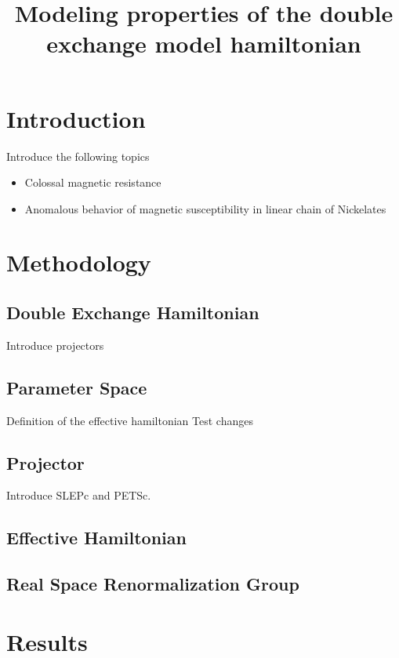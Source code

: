 \documentclass[ openright,titlepage,numbers=noenddot,headinclude,twoside,%
                footinclude=true,cleardoublepage=empty,abstractoff,%
                BCOR=5mm,paper=a4,fontsize=11pt,%
                ngerman,american,%
]{scrreprt}
\title{Modeling properties of the double exchange model hamiltonian}
\begin{document}
\maketitle
\thispagestyle{fancy}
\chapter{Introduction}

Introduce the following topics
\begin{itemize}
  \item Colossal magnetic resistance
  \item Anomalous behavior of magnetic susceptibility in linear chain of Nickelates
\end{itemize}

\chapter{Methodology}

\section{Double Exchange Hamiltonian}

Introduce projectors

\section{Parameter Space}

Definition of the effective hamiltonian
Test changes

\section{Projector}

Introduce SLEPc and PETSc.

\section{Effective Hamiltonian}

\section{Real Space Renormalization Group}

\chapter{Results}
\end{document}
